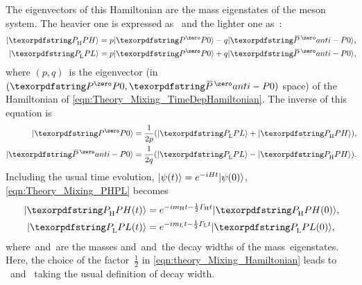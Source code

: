 The eigenvectors of this Hamiltonian are the mass eigenstates of the meson system.
The heavier one is expressed as~\ket{\ph} and the lighter one as~\ket{\pl}:
%
\begin{subequations} \label{eqn:Theory_Mixing_PHPL}
    \begin{align}
        \ket{\ph} &= p\ket{\pz} - q\ket{\pzb} \rlap{,} \\
        \ket{\pl} &= p\ket{\pz} + q\ket{\pzb} \rlap{,}
    \end{align}
\end{subequations}
%
where \({(p, q)}\)~is the eigenvector (in \({(\pz, \pzb)}\) space) of the Hamiltonian of \cref{eqn:Theory_Mixing_TimeDepHamiltonian}.
The inverse of this equation is
%
\begin{subequations} \label{eqn:Theory_Mixing_PZPZB}
    \begin{align}
        \ket{\pz}  &= \dfrac{1}{2p} (\ket{\pl} + \ket{\ph}) \rlap{,} \\
        \ket{\pzb} &= \dfrac{1}{2q} (\ket{\pl} - \ket{\ph}) \rlap{.}
    \end{align}
\end{subequations}
%
Including the usual time evolution, \({|\psi(t)\rangle = e^{-iHt} |\psi(0)\rangle}\), \cref{eqn:Theory_Mixing_PHPL} becomes
%
\begin{subequations} \label{eqn:Theory_Mixing_PHPL_TimeDep}
    \begin{align}
        \ket{\ph(t)} &= e^{-i \mH t - \frac{1}{2} \GH t} \ket{\ph(0)} \rlap{,} \\
        \ket{\pl(t)} &= e^{-i \mL t - \frac{1}{2} \GL t} \ket{\pl(0)} \rlap{,}
    \end{align}
\end{subequations}
%
where~\mH and~\mL are the masses and~\GH and~\GL the decay widths of the mass~eigenstates.
Here, the choice of the factor~\(\frac{1}{2}\) in \cref{eqn:theory_Mixing_Hamiltonian} leads to \GH~and \GL~taking the usual definition of decay width.

